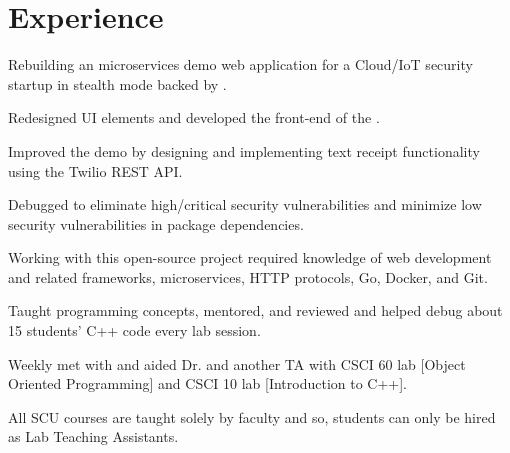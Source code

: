\documentclass[]{deedy-resume-openfont}
\begin{document}
\hfill
\begin{minipage}[t]{0.66\textwidth} 



\section{Experience}

\vspace{\topsep} %
\begin{tightemize}\item Rebuilding an \href{https://microservices-demo.github.io/}{} microservices demo web application for a Cloud/IoT security startup in stealth mode backed by \href{http://www.thefabricnet.com/}{}.
\item Redesigned UI elements and developed the front-end of the \href{https://github.com/tanya-sonker/KupcakeShop}{}. 
\item Improved the demo by designing and implementing text receipt functionality using the Twilio REST API.
\item Debugged to eliminate high/critical security vulnerabilities and minimize low  security vulnerabilities in package dependencies.
\item Working with this open-source project required knowledge of web development and related frameworks, microservices, HTTP protocols, Go, Docker, and Git.
\end{tightemize}
\sectionsep

\begin{tightemize}\item Taught programming concepts, mentored, and reviewed and helped debug about 15 students' C++ code every lab session. \item Weekly met with and aided Dr.  \href{https://math.scu.edu/~linnell/}{} and another TA with CSCI 60 lab [Object Oriented Programming] and CSCI 10 lab [Introduction to C++]. 
\item All SCU courses are taught solely by faculty and so, students can only be hired as Lab Teaching Assistants.
\end{tightemize}
\sectionsep


\end{minipage}
\end{document}
